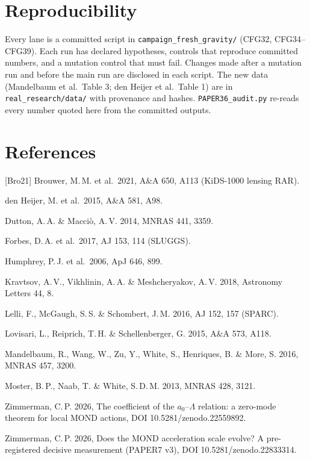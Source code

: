\documentclass[10pt]{article}
\newcommand{\fpath}[1]{\nolinkurl{#1}}
\begin{document}
\section{Reproducibility}\label{sec:rep}

Every lane is a committed script in \fpath{campaign_fresh_gravity/} (CFG32, CFG34--CFG39). Each run has declared hypotheses, controls that reproduce committed numbers, and a mutation control that must fail. Changes made after a mutation run and before the main run are disclosed in each script. The new data (Mandelbaum et al.\ Table 3; den Heijer et al.\ Table 1) are in \fpath{real_research/data/} with provenance and hashes. \fpath{PAPER36_audit.py} re-reads every number quoted here from the committed outputs.

\section*{References}
\small
[Bro21] Brouwer, M.\,M. et al.\ 2021, A\&A 650, A113 (KiDS-1000 lensing RAR).\par
[dH15] den Heijer, M. et al.\ 2015, A\&A 581, A98.\par
[DM14] Dutton, A.\,A. \& Macci\`o, A.\,V. 2014, MNRAS 441, 3359.\par
[F17] Forbes, D.\,A. et al.\ 2017, AJ 153, 114 (SLUGGS).\par
[H06] Humphrey, P.\,J. et al.\ 2006, ApJ 646, 899.\par
[KVM18] Kravtsov, A.\,V., Vikhlinin, A.\,A. \& Meshcheryakov, A.\,V. 2018, Astronomy Letters 44, 8.\par
[LMS16] Lelli, F., McGaugh, S.\,S. \& Schombert, J.\,M. 2016, AJ 152, 157 (SPARC).\par
[LRS15] Lovisari, L., Reiprich, T.\,H. \& Schellenberger, G. 2015, A\&A 573, A118.\par
[M16] Mandelbaum, R., Wang, W., Zu, Y., White, S., Henriques, B. \& More, S. 2016, MNRAS 457, 3200.\par
[MNW13] Moster, B.\,P., Naab, T. \& White, S.\,D.\,M. 2013, MNRAS 428, 3121.\par
[Z26a] Zimmerman, C.\,P. 2026, The coefficient of the $a_0$--$\Lambda$ relation: a zero-mode theorem for local MOND actions, DOI 10.5281/zenodo.22559892.\par
[Z26c] Zimmerman, C.\,P. 2026, Does the MOND acceleration scale evolve? A pre-registered decisive measurement (PAPER7 v3), DOI 10.5281/zenodo.22833314.\par
\end{document}

